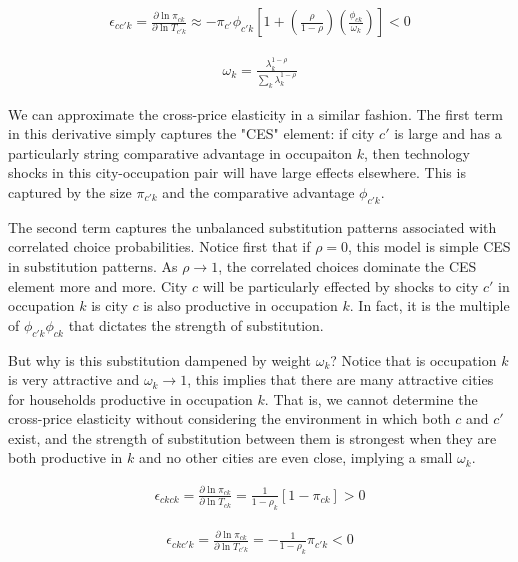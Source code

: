\documentclass[10pt]{article}
\begin{document}
\begin{align}
    \epsilon_{cc'k} = \frac{\partial \ln \pi_{ck}}{\partial \ln T_{c'k}} \approx - \pi_{c'} \phi_{c'k} \left[ 1 + \left( \frac{\rho}{1 - \rho} \right) \left( \frac{\phi_{ck}}{\omega_k} \right) \right] < 0
\end{align}

\begin{align}
    \omega_k = \frac{\lambda_k^{1 - \rho}}{\sum_{k}^{} \lambda_k^{1 - \rho}}
\end{align}

We can approximate the cross-price elasticity in a similar fashion. The first term in this derivative simply captures the "CES" element: if city $c'$ is large and has a particularly string comparative advantage in occupaiton $k$, then technology shocks in this city-occupation pair will have large effects elsewhere. This is captured by the size $\pi_{c'k}$ and the comparative advantage $\phi_{c'k}$.

The second term captures the unbalanced substitution patterns associated with correlated choice probabilities. Notice first that if $\rho = 0$, this model is simple CES in substitution patterns. As $\rho \to 1$, the correlated choices dominate the CES element more and more. City $c$ will be particularly effected by shocks to city $c'$ in occupation $k$ is city $c$ is also productive in occupation $k$. In fact, it is the multiple of $\phi_{c'k} \phi_{ck}$ that dictates the strength of substitution.

But why is this substitution dampened by weight $\omega_k$? Notice that is occupation $k$ is very attractive and $\omega_k \to 1$, this implies that there are many attractive cities for households productive in occupation $k$. That is, we cannot determine the cross-price elasticity without considering the environment in which both $c$ and $c'$ exist, and the strength of substitution between them is strongest when they are both productive in $k$ and no other cities are even close, implying a small $\omega_k$.

\begin{align}
    \epsilon_{ckck} = \frac{\partial \ln \pi_{ck}}{\partial \ln T_{ck}} = \frac{1}{1 - \rho_k} \left[ 1 - \pi_{ck} \right] > 0
\end{align}

\begin{align}
    \epsilon_{ckc'k} = \frac{\partial \ln \pi_{ck}}{\partial \ln T_{c'k}} = - \frac{1}{1 - \rho_k} \pi_{c'k} < 0
\end{align}
\end{document}
